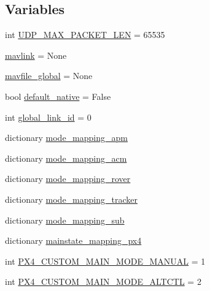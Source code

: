 \subsection*{Variables}
\begin{DoxyCompactItemize}
\item 
int \mbox{\hyperlink{namespacepymavlink_1_1mavutil_a1fce3ac17837c857546999343dbd5bc3}{U\+D\+P\+\_\+\+M\+A\+X\+\_\+\+P\+A\+C\+K\+E\+T\+\_\+\+L\+EN}} = 65535
\item 
\mbox{\hyperlink{namespacepymavlink_1_1mavutil_abae56506546c35864f22d14ba69c235f}{mavlink}} = None
\item 
\mbox{\hyperlink{namespacepymavlink_1_1mavutil_a08066205cd90c34fb96e4c0e2be4ce59}{mavfile\+\_\+global}} = None
\item 
bool \mbox{\hyperlink{namespacepymavlink_1_1mavutil_a21ce9da7b698a7bc21c44b9f77341b62}{default\+\_\+native}} = False
\item 
int \mbox{\hyperlink{namespacepymavlink_1_1mavutil_a7a6fe2ed1668de666146b7bb892dad47}{global\+\_\+link\+\_\+id}} = 0
\item 
dictionary \mbox{\hyperlink{namespacepymavlink_1_1mavutil_a023b89a21397ad637968300c0fc9a1f1}{mode\+\_\+mapping\+\_\+apm}}
\item 
dictionary \mbox{\hyperlink{namespacepymavlink_1_1mavutil_a3da8a514b4af72e60922ae1a662556be}{mode\+\_\+mapping\+\_\+acm}}
\item 
dictionary \mbox{\hyperlink{namespacepymavlink_1_1mavutil_a7cfdbccdb707b693735a98793d4475ce}{mode\+\_\+mapping\+\_\+rover}}
\item 
dictionary \mbox{\hyperlink{namespacepymavlink_1_1mavutil_ae19716483a060aee074801e40554ca42}{mode\+\_\+mapping\+\_\+tracker}}
\item 
dictionary \mbox{\hyperlink{namespacepymavlink_1_1mavutil_a5472e17a46fef18aa4f73d62c5a7c40a}{mode\+\_\+mapping\+\_\+sub}}
\item 
dictionary \mbox{\hyperlink{namespacepymavlink_1_1mavutil_ac9d749bf27ffcda89f1df443284c2ff5}{mainstate\+\_\+mapping\+\_\+px4}}
\item 
int \mbox{\hyperlink{namespacepymavlink_1_1mavutil_ac79afe08d501c6cc0630ced7681307ae}{P\+X4\+\_\+\+C\+U\+S\+T\+O\+M\+\_\+\+M\+A\+I\+N\+\_\+\+M\+O\+D\+E\+\_\+\+M\+A\+N\+U\+AL}} = 1
\item 
int \mbox{\hyperlink{namespacepymavlink_1_1mavutil_a6e29a5d8b34ab1b9922e6e1a28f6057a}{P\+X4\+\_\+\+C\+U\+S\+T\+O\+M\+\_\+\+M\+A\+I\+N\+\_\+\+M\+O\+D\+E\+\_\+\+A\+L\+T\+C\+TL}} = 2
\item 

\end{DoxyCompactItemize}
